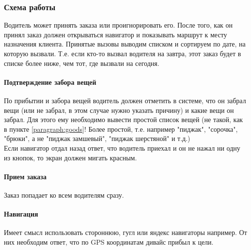 \documentclass[DIV=calc, paper=a4, fontsize=11pt]{scrartcl} %
\begin{document}
\subsubsection{Схема работы}
Водитель может принять заказа или проигнорировать его. После того, как он принял заказ должен открываться навигатор и показывать маршрут к месту назначения клиента. Принятые вызовы выводим списком и сортируем по дате, на которую вызвали. Т.е. если кто-то вызвал водителя на завтра, этот заказ будет в списке более ниже, чем тот, где вызвали на сегодня.

\paragraph{Подтверждение забора вещей}
По прибытии и забора вещей водитель должен отметить в системе, что он забрал вещи (или не забрал, в этом случае нужно указать причину) и какие вещи он забрал. Для этого ему необходимо вывести простой список вещей (не такой, как в пункте \ref{paragraph:goods}! Более простой, т.е. например "пиджак", "сорочка", "брюки", а не "пиджак замшевый", "пиджак шерстяной" и т.д.)
\\[0.5cm]
Если навигатор отдал назад ответ, что водитель приехал и он не нажал ни одну из кнопок, то экран должен мигать красным.

\paragraph{Прием заказа}
Заказ попадает ко всем водителям сразу. 



\paragraph{Навигация}
Имеет смысл использовать стороннюю, гугл или яндекс навигаторы например. От них необходим ответ, что по GPS координатам дивайс прибыл к цели.
\end{document}
